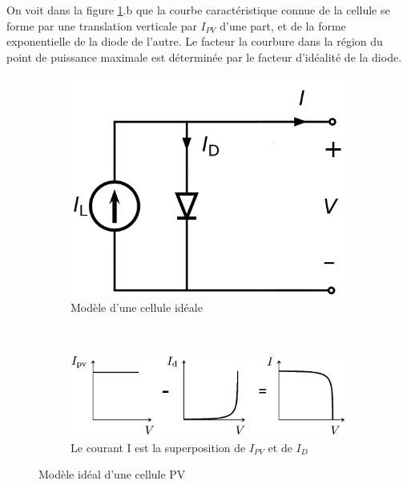 On voit dans la figure \ref{fig:idealcell}.b que la courbe caractéristique connue de la cellule se forme par une translation verticale par $I_{PV}$ d'une part, et de la forme exponentielle de la diode de l'autre. Le facteur la courbure dans la région du point de puissance maximale est déterminée par le facteur d'idéalité de la diode.

\begin{figure}[t!]
  \centering
  \begin{subfigure}[t]{0.3\textwidth}
      \centering
      \includegraphics[width=\textwidth]{resources/idealcell.png}
      \caption{Modèle d'une cellule idéale}
  \end{subfigure}
  ~
  \begin{subfigure}[t]{0.65\textwidth}
      \centering
      \includegraphics[width=\textwidth]{resources/superp.png}
      \caption{Le courant I est la superposition de $I_{PV}$ et de $I_D$ \cite{Villalva2009}}
  \end{subfigure}
  \caption{Modèle idéal d'une cellule PV}
  \label{fig:idealcell}
\end{figure}

